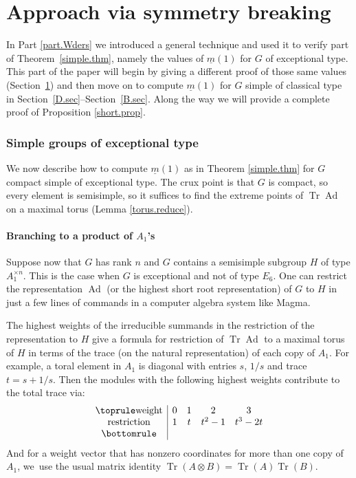 \documentclass[JEP,XML,SOM,Unicode,NoFloatCountersInSection,published]{cedram}
\theoremstyle{definition}
\newcommand{\mmin}{\underline{m}}
\DeclareMathOperator{\Tr}{Tr}
\DeclareMathOperator{\Ad}{Ad}
\DeclareMathOperator{\tr}{Tr}
\begin{document}
\part{Approach via symmetry breaking} \label{part.break}

In Part \ref{part.Wders} we introduced a general technique and used it to verify part of Theorem~\ref{simple.thm}, namely the values of $\mmin(1)$ for $G$ of exceptional type. This part of the paper will begin by giving a different proof of those same values (Section~\ref{serre.method}) and then move on to compute $\mmin(1)$ for $G$ simple of classical type in Section~\ref{D.sec}--Section~\ref{B.sec}. Along the way we will provide a complete proof of Proposition \ref{short.prop}.

\section{Simple groups of exceptional type} \label{serre.method}

We now describe how to compute $\mmin(1)$ as in Theorem \ref{simple.thm} for $G$ compact simple of exceptional type. The crux point is that $G$ is compact, so every element is semisimple, so it suffices to find the extreme points of $\Tr \Ad$ on a maximal torus (Lemma \ref{torus.reduce}).

\subsection*{Branching to a product of \texorpdfstring{$A_1$}{A1}'s}
Suppose now that $G$ has rank $n$ and $G$ contains a semisimple subgroup $H$ of type $A_1^{\times n}$. This is the case when $G$ is exceptional and not of type $E_6$. One can restrict the representation $\Ad$ (or the highest short root representation) of $G$ to $H$ in just a few lines of commands in a computer algebra system like Magma.

The highest weights of the irreducible summands in the restriction of the representation to $H$ give a formula for restriction of $\Tr \Ad$ to a maximal torus of $H$ in terms of the trace (on the natural representation) of each copy of $A_1$. For example, a toral element in $A_1$ is diagonal with entries $s$, $1/s$ and trace $t = s + 1/s$. Then the modules with the following highest weights contribute to the total trace via:
\begin{equation} \label{cheb.small}
\begin{array}{c|cccc} \toprule
\text{weight} & 0&1&2&3 \\
\text{restriction} & 1 & t & t^2 - 1 & t^3 - 2t \\ \bottomrule
\end{array}
\end{equation}
And for a weight vector that has nonzero coordinates for more than one copy of $A_1$, we~use the usual matrix identity $\tr(A \otimes B) = \tr(A) \tr(B)$.
\end{document}
